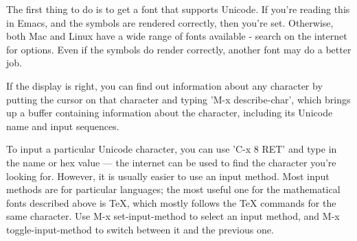 The first thing to do is to get a font that supports Unicode.  If you're
reading this in Emacs, and the symbols are rendered correctly, then you're
set.  Otherwise, both Mac and Linux have a wide range of fonts available -
search on the internet for options.  Even if the symbols do render
correctly, another font may do a better job.

If the display is right, you can find out information about any character
by putting the cursor on that character and typing 'M-x describe-char',
which brings up a buffer containing information about the character,
including its Unicode name and input sequences.

To input a particular Unicode character, you can use 'C-x 8 RET' and type in
the name or hex value — the internet can be used to find the character
you're looking for.  However, it is usually easier to use an input
method.  Most input methods are for particular languages; the most useful
one for the mathematical fonts described above is TeX, which mostly
follows the TeX commands for the same character.  Use M-x set-input-method
to select an input method, and M-x toggle-input-method to switch between
it and the previous one.
